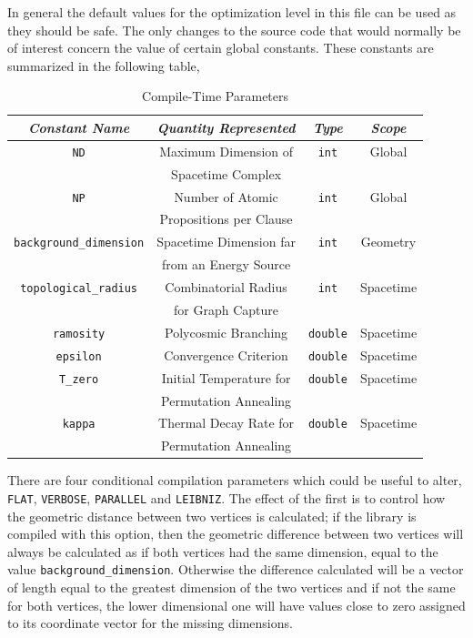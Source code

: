 \documentclass[12pt,letterpaper]{report}
\begin{document}
In general the default values for the optimization level in this file can be used as 
they should be safe. The only changes to the source code that would normally be of interest 
concern the value of certain global constants. These constants are summarized in the following table,
\begin{table}[htbp]
\centering
\begin{tabular}{|c|c|c|c|}
\hline
\emph{Constant Name} & \emph{Quantity Represented} & \emph{Type} & \emph{Scope} \\ \hline
\texttt{ND} & Maximum Dimension of                  & \texttt{int} & Global \\ 
           & Spacetime Complex                     &             &        \\ \hline
\texttt{NP} & Number of Atomic                       & \texttt{int} & Global \\ 
           & Propositions per Clause               &              &         \\ \hline
\texttt{background\_dimension} & Spacetime Dimension far & \texttt{int}  & Geometry \\ 
                              & from an Energy Source    &             &           \\ \hline
\texttt{topological\_radius} & Combinatorial Radius & \texttt{int} & Spacetime \\
                            & for Graph Capture &          &           \\ \hline
\texttt{ramosity} & Polycosmic Branching & \texttt{double} & Spacetime \\ \hline
\texttt{epsilon} & Convergence Criterion & \texttt{double} & Spacetime \\ \hline
\texttt{T\_zero} & Initial Temperature for & \texttt{double} & Spacetime \\
               & Permutation Annealing   &                &           \\ \hline
\texttt{kappa} & Thermal Decay Rate for   & \texttt{double} & Spacetime \\
              & Permutation Annealing    &                &           \\ \hline
\end{tabular}
\caption{Compile-Time Parameters}
\label{ct_parms}
\end{table}
There are four conditional compilation parameters which could be useful to alter, 
\texttt{FLAT}, \texttt{VERBOSE}, \texttt{PARALLEL} and \texttt{LEIBNIZ}. The effect of the 
first is to control how the geometric distance between two vertices is calculated; 
if the library is compiled with this option, then the geometric difference between 
two vertices will always be calculated as if both vertices had the same dimension, 
equal to the value \texttt{background\_dimension}. Otherwise the difference calculated 
will be a vector of length equal to the greatest dimension of the two vertices and 
if not the same for both vertices, the lower dimensional one will have values close 
to zero assigned to its coordinate vector for the missing dimensions. 
\end{document}
